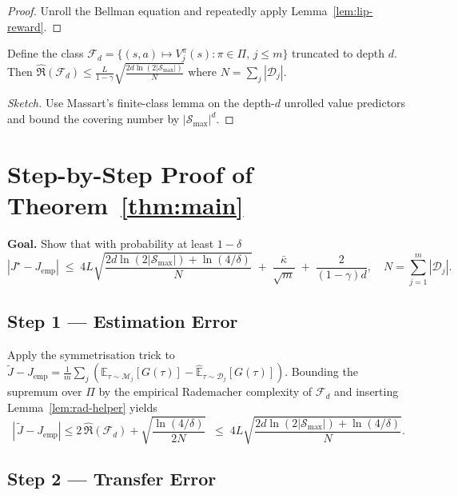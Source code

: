 \begin{proof}
Unroll the Bellman equation and repeatedly apply
Lemma~\ref{lem:lip-reward}.
\end{proof}

\begin{lemma}\label{lem:rad-helper}
Define the class
$\mathcal F_d=\{(s,a)\mapsto V^{\pi}_j(s) :
               \pi\in\Pi,\, j\le m\}$ truncated to depth $d$.
Then
$\widehat{\mathfrak R}(\mathcal F_d)
  \le \frac{L}{1-\gamma}\sqrt{\frac{2d\ln(2|\mathcal S_{\max}|)}{N}}
$ where $N=\sum_j|\mathcal D_j|$.
\end{lemma}

\begin{proof}[Sketch]
Use Massart’s finite-class lemma on the depth-$d$ unrolled value predictors
and bound the covering number by $|\mathcal S_{\max}|^{d}$.
\end{proof}

\section{Step-by-Step Proof of Theorem~\ref{thm:main}}
\label{app:thm-proof}

\textbf{Goal.}\;
Show that with probability at least $1-\delta$
\[
|J^\star-J_{\mathrm{emp}}|
\;\le\;
4L\sqrt{\frac{2d\ln(2|\mathcal S_{\max}|)+\ln(4/\delta)}{N}}
\;+\;
\frac{\bar\kappa}{\sqrt m}
\;+\;
\frac{2}{(1-\gamma)d},
\quad
N=\!\!\sum_{j=1}^{m}\!|\mathcal D_j|.
\]

\subsection{Step 1 — Estimation Error}

Apply the symmetrisation trick to
$\tilde J-\!J_{\mathrm{emp}}
  =\frac1m\!\sum_{j}\!(\mathbb E_{\tau\!\sim\!\mathcal M_j}[G(\tau)]
                      -\widehat{\mathbb E}_{\tau\!\sim\!\mathcal D_j}[G(\tau)])$.
Bounding the supremum over $\Pi$ by the empirical Rademacher complexity of
$\mathcal F_d$ and inserting Lemma~\ref{lem:rad-helper} yields
\[
|\,\tilde J-J_{\mathrm{emp}}|\le
2\,\widehat{\mathfrak R}(\mathcal F_d)
  +\sqrt{\frac{\ln(4/\delta)}{2N}}
\;\;\le\;
4L\sqrt{\frac{2d\ln(2|\mathcal S_{\max}|)+\ln(4/\delta)}{N}} .
\]

\subsection{Step 2 — Transfer Error}

